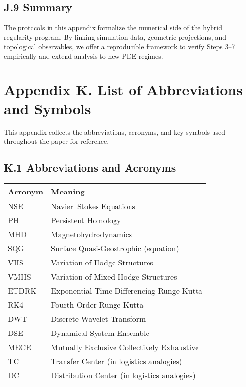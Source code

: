 \documentclass[11pt]{article}
\theoremstyle{definition}
\begin{document}
\subsection*{J.9 Summary}
The protocols in this appendix formalize the numerical side of the hybrid regularity program. By linking simulation data, geometric projections, and topological observables, we offer a reproducible framework to verify Steps 3--7 empirically and extend analysis to new PDE regimes.


\section*{Appendix K. List of Abbreviations and Symbols}

This appendix collects the abbreviations, acronyms, and key symbols used throughout the paper for reference.

\subsection*{K.1 Abbreviations and Acronyms}
\begin{tabular}{ll}
\textbf{Acronym} & \textbf{Meaning} \\
\hline
NSE & Navier--Stokes Equations \\
PH & Persistent Homology \\
MHD & Magnetohydrodynamics \\
SQG & Surface Quasi-Geostrophic (equation) \\
VHS & Variation of Hodge Structures \\
VMHS & Variation of Mixed Hodge Structures \\
ETDRK & Exponential Time Differencing Runge-Kutta \\
RK4 & Fourth-Order Runge-Kutta \\
DWT & Discrete Wavelet Transform \\
DSE & Dynamical System Ensemble \\
MECE & Mutually Exclusive Collectively Exhaustive \\
TC & Transfer Center (in logistics analogies) \\
DC & Distribution Center (in logistics analogies) \\
\end{tabular}
\end{document}
